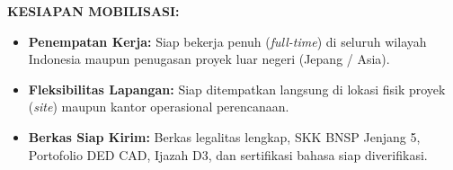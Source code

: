 \documentclass[10pt,a4paper,landscape]{article}
\begin{document}
\begin{minipage}[t]{0.32\linewidth}
  \begin{tcolorbox}[sharp corners, boxrule=0.6pt, colframe=pnavy, colback=pbglight, left=2.5mm, right=2.5mm, top=2mm, bottom=2mm, height=52mm]
    {\fontsize{7pt}{8.5pt}\selectfont\bfseries\color{pnavy}KESIAPAN MOBILISASI:}\\[1.5mm]
    {\fontsize{6.3pt}{8.2pt}\selectfont\color{psteel}
    \begin{itemize}[leftmargin=3.5mm, itemsep=1.2mm, topsep=0mm, parsep=0mm]
      \item \textbf{Penempatan Kerja:} Siap bekerja penuh (\textit{full-time}) di seluruh wilayah Indonesia maupun penugasan proyek luar negeri (Jepang / Asia).
      \item \textbf{Fleksibilitas Lapangan:} Siap ditempatkan langsung di lokasi fisik proyek (\textit{site}) maupun kantor operasional perencanaan.
      \item \textbf{Berkas Siap Kirim:} Berkas legalitas lengkap, SKK BNSP Jenjang 5, Portofolio DED CAD, Ijazah D3, dan sertifikasi bahasa siap diverifikasi.
    \end{itemize}
    }
  \end{tcolorbox}
\end{minipage}%
\hfill
\end{document}
